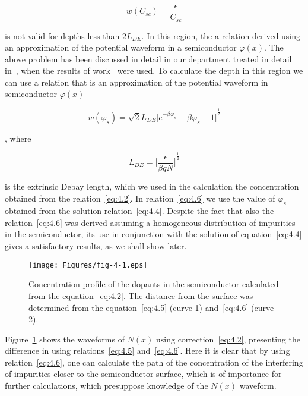 \begin{equation}\label{eq:4.5}
  w(C_{sc})=\frac{\epsilon}{C_{sc}}
\end{equation}

is not valid for depths less than $2L_{DE}$. In this region, the a
relation derived using an approximation of the potential waveform in a
semiconductor $\varphi(x)$. The above problem has been discussed in
detail in our department treated in detail in~\cite{4.13, 4.14}, when
the results of work~\cite{4.9, 4.10, 4.11} were used. To calculate the
depth in this region we can use a relation that is an approximation of
the potential waveform in semiconductor $\varphi(x)$~\cite{I.1}

\begin{equation}\label{eq:4.6}
  w(\varphi_{s})=\sqrt{2}L_{DE}{\big[e^{-\beta\varphi_{s}}+\beta\varphi_{s}-1\big]}^{\frac{1}{2}}
\end{equation}

, where

\begin{equation}\label{eq:4.7}
  L_{DE} = {\Big[\frac{\epsilon}{\beta qN}\Big]}^{\frac{1}{2}}
\end{equation}

is the extrinsic Debay length, which we used in the calculation the
concentration obtained from the relation~\ref{eq:4.2}.  In
relation~\ref{eq:4.6} we use the value of $\varphi_{s}$ obtained from
the solution relation~\ref{eq:4.4}. Despite the fact that also the
relation~\ref{eq:4.6} was derived assuming a homogeneous distribution
of impurities in the semiconductor, its use in conjunction with the
solution of equation~\ref{eq:4.4} gives a satisfactory results, as we
shall show later.

\begin{figure}[h!]\centering
  \texttt{[image: Figures/fig-4-1.eps]}%
  \caption[Concentration profile of dopants in a semiconductor
    calculated from the relation~\ref{eq:4.2}]{Concentration profile
    of the dopants in the semiconductor calculated from the
    equation~\ref{eq:4.2}. The distance from the surface was
    determined from the equation~\ref{eq:4.5} (curve 1)
    and~\ref{eq:4.6} (curve 2).}\label{fig:4.1}
\end{figure}

Figure~\ref{fig:4.1} shows the waveforms of $N(x)$ using
correction~\ref{eq:4.2}, presenting the difference in using
relations~\ref{eq:4.5} and~\ref{eq:4.6}. Here it is clear that by
using relation~\ref{eq:4.6}, one can calculate the path of the
concentration of the interfering of impurities closer to the
semiconductor surface, which is of importance for further
calculations, which presuppose knowledge of the $N(x)$ waveform.

